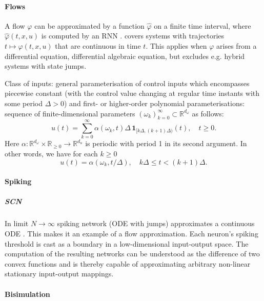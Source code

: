 \documentclass{article}
\theoremstyle{definition}
\theoremstyle{remark}
\begin{document}
\paragraph{Flows}
A flow $\varphi$ can be approximated by a function $\hat\varphi$ on a finite time interval, where $\hat \varphi(t, x, u)$ is computed by an RNN \citep{aguiar2023}.
\citet{aguiar2023} covers systems with trajectories $t\mapsto\varphi(t, x, u)$ that are continuous in time $t$.
This applies when $\varphi$ arises from a differential equation, differential algebraic equation, but excludes e.g. hybrid systems with state jumps.

Class of inputs: general parameterisation of control inputs which encompasses piecewise constant (with the control value changing at regular time instants with some period $\Delta > 0$) and first- or higher-order polynomial parameterisations: 
sequence of finite-dimensional parameters \((\omega_k)_{k=0}^{\infty} \subset \mathbb{R}^{d_\omega}\) as follows:
\[
u(t) = \sum_{k=0}^{\infty} \alpha \left( \omega_k, t \right) \Delta \, \mathbf{1}_{[k\Delta,(k+1)\Delta)}(t), \quad t \geq 0.
\]
Here \(\alpha : \mathbb{R}^{d_\omega} \times \mathbb{R}_{\geq 0} \rightarrow \mathbb{R}^{d_u}\) is periodic with period 1 in its second argument. In other words, we have for each \(k \geq 0\)
\[
u(t) = \alpha(\omega_k, t/\Delta), \quad k\Delta \leq t < (k + 1)\Delta.
\]



\paragraph{Spiking}
\citep{thalmeier2016learning}

\subparagraph{SCN}
In limit $N\rightarrow\infty$ spiking network (ODE with jumps) approximates a continuous ODE \citep{podlaski2024approximating}. 
This makes it  an example of a flow approximation.
Each neuron’s spiking threshold is cast as a boundary in a low-dimensional input-output space.
The computation of the resulting networks can be understood as the difference of two convex functions and is thereby capable of approximating arbitrary non-linear stationary input-output mappings.




\paragraph{Bisimulation}
\citep{vanderschaft2004bisimulation}
\citep{vanderschaft2004equivalence}
\citep{zamani2014symbolic}
\end{document}
